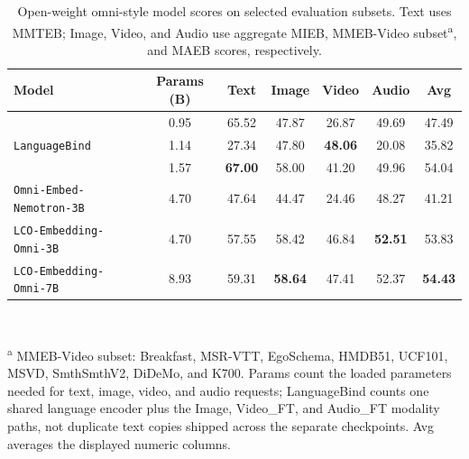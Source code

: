 \begin{table}[th]
  \caption{Open-weight omni-style model scores on selected evaluation subsets.
  Text uses MMTEB; Image, Video, and Audio use aggregate MIEB, MMEB-Video subset\textsuperscript{a}, and MAEB scores, respectively.}
  \label{tab:omni-frontier}
  \centering
  \small
  \setlength{\tabcolsep}{5pt}
  \begin{tabular*}{\textwidth}{@{\extracolsep{\fill}}lcccccc@{}}
    \toprule
    Model & Params (B) & Text & Image & Video & Audio & Avg \\
    \midrule
    \omniNano{} & 0.95 & 65.52 & 47.87 & 26.87 & 49.69 & 47.49 \\
    \texttt{LanguageBind} & 1.14 & 27.34 & 47.80 & \textbf{48.06} & 20.08 & 35.82 \\
    \omniSmall{} & 1.57 & \textbf{67.00} & 58.00 & 41.20 & 49.96 & 54.04 \\
    \texttt{Omni-Embed-Nemotron-3B} & 4.70 & 47.64 & 44.47 & 24.46 & 48.27 & 41.21 \\
    \texttt{LCO-Embedding-Omni-3B} & 4.70 & 57.55 & 58.42 & 46.84 & \textbf{52.51} & 53.83 \\
    \texttt{LCO-Embedding-Omni-7B} & 8.93 & 59.31 & \textbf{58.64} & 47.41 & 52.37 & \textbf{54.43} \\
    \bottomrule
  \end{tabular*}
  \\[0.4em]
  \begin{minipage}{0.97\textwidth}
  \footnotesize
  \textsuperscript{a} MMEB-Video subset: Breakfast, MSR-VTT, EgoSchema, HMDB51, UCF101, MSVD, SmthSmthV2, DiDeMo, and K700.
  Params count the loaded parameters needed for text, image, video, and audio requests; LanguageBind counts one shared language encoder plus the Image, Video\_FT, and Audio\_FT modality paths, not duplicate text copies shipped across the separate checkpoints.
  Avg averages the displayed numeric columns.
  \end{minipage}
\end{table}


